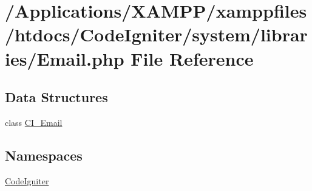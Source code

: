\hypertarget{_email_8php}{}\section{/\+Applications/\+X\+A\+M\+P\+P/xamppfiles/htdocs/\+Code\+Igniter/system/libraries/\+Email.php File Reference}
\label{_email_8php}
\subsection*{Data Structures}
\begin{DoxyCompactItemize}
\item 
class \mbox{\hyperlink{class_c_i___email}{C\+I\+\_\+\+Email}}
\end{DoxyCompactItemize}
\subsection*{Namespaces}
\begin{DoxyCompactItemize}
\item 
 \mbox{\hyperlink{namespace_code_igniter}{Code\+Igniter}}
\end{DoxyCompactItemize}
